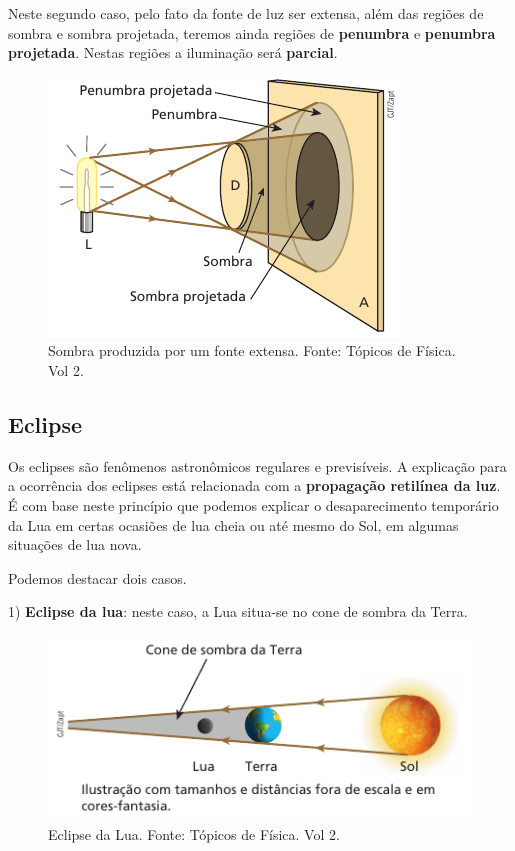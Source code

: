 \documentclass[11pt,twocolumn,oneside]{article}
\begin{document}
Neste segundo caso, pelo fato da fonte de luz ser extensa, além das regiões de sombra e sombra projetada, teremos ainda regiões de \textbf{penumbra} e \textbf{penumbra projetada}. Nestas regiões a iluminação será \textbf{parcial}.


\begin{figure}[h]{}
\centering\includegraphics[width=2.5truein]{img19.png}
\caption{Sombra produzida por um fonte extensa. Fonte: Tópicos de Física. Vol 2.}
\centering
\end{figure}

\hypertarget{x-eclipse}{\subsection{Eclipse}}
Os eclipses são fenômenos astronômicos regulares e previsíveis. A explicação para a ocorrência dos eclipses está relacionada com a \textbf{propagação retilínea da luz}. É com base neste princípio que podemos explicar o desaparecimento temporário da Lua em certas ocasiões de lua cheia ou até mesmo do Sol, em algumas situações de lua nova.


Podemos destacar dois casos.


1) \textbf{Eclipse da lua}: neste caso, a Lua situa-se no cone de sombra da Terra.


\begin{figure}[h]{}
\centering\includegraphics[width=2.5truein]{img20.png}
\caption{Eclipse da Lua. Fonte: Tópicos de Física. Vol 2.}
\centering
\end{figure}
\end{document}
